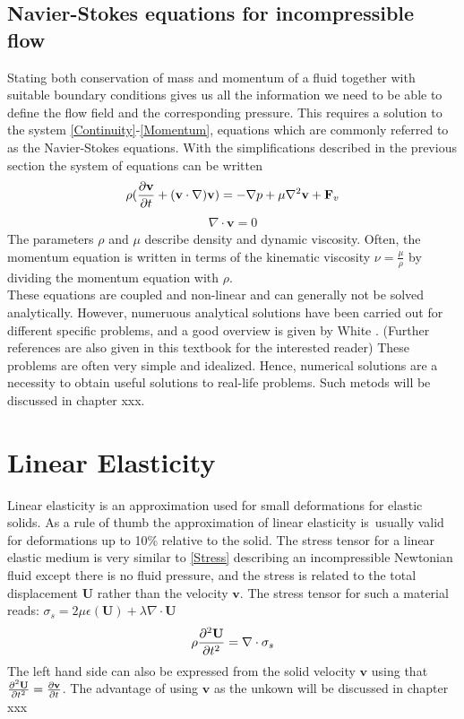 \subsection{Navier-Stokes equations for incompressible flow}
Stating both conservation of mass and momentum of a fluid together with suitable boundary conditions gives us all the information we need to be able to define the flow field and the corresponding pressure. This requires a solution to the system \eqref{Continuity}-\eqref{Momentum}, equations which are commonly referred to as the Navier-Stokes equations. With the simplifications described in the previous section the system of equations can be written
\begin{align}
\rho(\frac{\partial \mathbf{v}}{\partial t} + (\mathbf{v} \cdot \nabla) \mathbf{v}) = -\nabla p + \mu\nabla^2 \mathbf{v} + \mathbf{F}_v \label{Navier}
\end{align}
\begin{align}
\nabla \cdot \mathbf{v} = 0 \label{Stokes}
\end{align}
The parameters $\rho$ and $\mu$ describe density and dynamic viscosity. Often, the momentum equation is written in terms of the kinematic viscosity $\nu = \frac{\mu}{\rho}$ by dividing the momentum equation with $\rho$. \\
These equations are coupled and non-linear and can generally not be solved analytically. However, numeruous analytical solutions have been carried out for different specific problems, and a good overview is given by White \cite[pp. 97-164]{Whit06}. (Further references are also given in this textbook for the interested reader) These problems are often very simple and idealized. Hence, numerical solutions are a necessity to obtain useful solutions to real-life problems. Such metods will be discussed in chapter xxx. 


\section{Linear Elasticity}
Linear elasticity is an approximation used for small deformations for elastic solids. As a rule of thumb the approximation of linear elasticity is usually valid for deformations up to 10\% relative to the solid. The stress tensor for a linear elastic medium is very similar to \eqref{Stress} describing an incompressible Newtonian fluid except there is no fluid pressure, and the stress is related to the total displacement $\mathbf{U}$ rather than the velocity $\mathbf{v}$. The stress tensor for such a material reads:
$\sigma_s = 2\mu\epsilon(\mathbf{U}) + \lambda \nabla \cdot \mathbf{U}$
\begin{align} 
\rho \frac{\partial ^2\mathbf{U}}{\partial t^2} = \nabla \cdot \sigma_s \label{LE}
\end{align}
The left hand side can also be expressed from the solid velocity $\mathbf{v}$ using that $\frac{\partial ^2\mathbf{U}}{\partial t^2} = \frac{\partial \mathbf{v}}{\partial t} $. The advantage of using $\mathbf{v}$ as the unkown will be discussed in chapter xxx 
